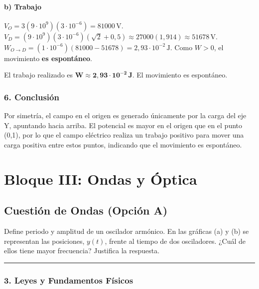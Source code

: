 \paragraph{b) Trabajo}
$V_O = 3(9\cdot10^9)(3\cdot10^{-6}) = 81000\,\text{V}$.
$V_D = (9\cdot10^9)(3\cdot10^{-6})(\sqrt{2}+0,5) \approx 27000(1,914) \approx 51678\,\text{V}$.
$W_{O \to D} = (1\cdot10^{-6})(81000 - 51678) = 2,93\cdot10^{-2}\,\text{J}$.
Como $W>0$, el movimiento \textbf{es espontáneo}.
\begin{cajaresultado}
El trabajo realizado es $\boldsymbol{W \approx 2,93\cdot10^{-2}\,\textbf{J}}$. El movimiento es espontáneo.
\end{cajaresultado}

\subsubsection*{6. Conclusión}
\begin{cajaconclusion}
Por simetría, el campo en el origen es generado únicamente por la carga del eje Y, apuntando hacia arriba. El potencial es mayor en el origen que en el punto (0,1), por lo que el campo eléctrico realiza un trabajo positivo para mover una carga positiva entre estos puntos, indicando que el movimiento es espontáneo.
\end{cajaconclusion}

\newpage

\section{Bloque III: Ondas y Óptica}
\label{sec:ondas_opt_2016_jun_ord}

\subsection{Cuestión de Ondas (Opción A)}
\label{subsec:A2_2016_jun_ord_re}

\begin{cajaenunciado}
Define periodo y amplitud de un oscilador armónico. En las gráficas (a) y (b) se representan las posiciones, $y(t)$, frente al tiempo de dos osciladores. ¿Cuál de ellos tiene mayor frecuencia? Justifica la respuesta.
\end{cajaenunciado}
\hrule

\subsubsection*{3. Leyes y Fundamentos Físicos}
